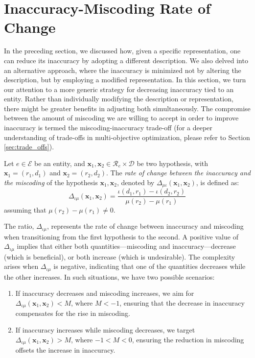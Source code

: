 \section{Inaccuracy-Miscoding Rate of Change}

In the preceding section, we discussed how, given a specific representation, one can reduce its inaccuracy by adopting a different description. We also delved into an alternative approach, where the inaccuracy is minimized not by altering the description, but by employing a modified representation. In this section, we turn our attention to a more generic strategy for decreasing inaccuracy tied to an entity. Rather than individually modifying the description or representation, there might be greater benefits in adjusting both simultaneously. The compromise between the amount of miscoding we are willing to accept in order to improve inaccuracy is termed the miscoding-inaccuracy trade-off (for a deeper understanding of trade-offs in multi-objective optimization, please refer to Section \ref{sec:trade_offs}).

\begin{definition}
Let $e \in \mathcal{E}$ be an entity, and $\mathbf{x}_1, \mathbf{x}_2 \in \mathcal{R}_e \times \mathcal{D}$ be two hypothesis, with $\mathbf{x}_1 = (r_1, d_1)$ and $\mathbf{x}_2 = (r_2, d_2)$. The \emph{rate of change between the inaccuracy and the miscoding} of the hypothesis $\mathbf{x}_1, \mathbf{x}_2$, denoted by $\Delta_{\mu \iota} ( \mathbf{x}_1, \mathbf{x}_2 )$, is defined as:
\[
\Delta_{\iota \mu} ( \mathbf{x}_1, \mathbf{x}_2 ) = \frac{\iota(d_1, r_1) - \iota(d_2, r_2)}{\mu(r_2) - \mu(r_1)}
\] 
assuming that $\mu(r_2) - \mu(r_1) \neq 0$.
\end{definition}

The ratio, \( \Delta_{\iota \mu} \), represents the rate of change between inaccuracy and miscoding when transitioning from the first hypothesis to the second. A positive value of \( \Delta_{\iota \mu} \) implies that either both quantities—miscoding and inaccuracy—decrease (which is beneficial), or both increase (which is undesirable). The complexity arises when \( \Delta_{\iota \mu} \) is negative, indicating that one of the quantities decreases while the other increases. In such situations, we have two possible scenarios:

\begin{enumerate}[label=(\roman*)]
\item If inaccuracy decreases and miscoding increases, we aim for \( \Delta_{\iota \mu} ( \mathbf{x}_1, \mathbf{x}_2 ) < M \), where \( M < -1 \), ensuring that the decrease in inaccuracy compensates for the rise in miscoding.
\item If inaccuracy increases while miscoding decreases, we target \( \Delta_{\iota \mu} ( \mathbf{x}_1, \mathbf{x}_2 ) > M \), where \( -1 < M < 0 \), ensuring the reduction in miscoding offsets the increase in inaccuracy. 
\end{enumerate}

